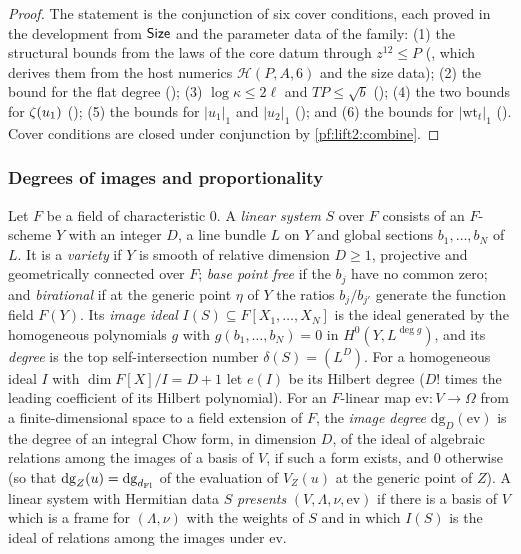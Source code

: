 \begin{proof}
The statement is the conjunction of six cover conditions, each proved in the development from $\mathsf{Size}$ and
the parameter data of the family: (1) the structural bounds from the laws of the core datum through $z^{12}\le P$
(, which derives them from the host numerics $\mathcal H(P,A,6)$
and the size data); (2) the bound for the flat degree
(); (3) $\log\kappa\le2\ell$ and $TP\le\sqrt b$
(); (4) the two bounds for $\zeta(u_1)$
(); (5) the bounds for $|u_1|_1$ and $|u_2|_1$
(); and (6) the bounds for $|\mathrm{wt}_t|_1$
(). Cover conditions are closed under conjunction by
\cref{pf:lift2:combine}.
\end{proof}

\subsubsection*{Degrees of images and proportionality}

\begin{definition}\label{pf:lift2:def:linsys}
Let $F$ be a field of characteristic $0$. A \emph{linear system} $S$ over $F$ consists of an $F$-scheme $Y$ with an
integer $D$, a line bundle $L$ on $Y$ and global sections $b_1,\dots,b_N$ of $L$. It is a \emph{variety} if $Y$ is
smooth of relative dimension $D\ge1$, projective and geometrically connected over $F$; \emph{base point free} if the
$b_j$ have no common zero; and \emph{birational} if at the generic point $\eta$ of $Y$ the ratios $b_j/b_{j'}$
generate the function field $F(Y)$. Its \emph{image ideal} $I(S)\subseteq F[X_1,\dots,X_N]$ is the ideal generated by
the homogeneous polynomials $g$ with $g(b_1,\dots,b_N)=0$ in $H^0(Y,L^{\deg g})$, and its \emph{degree} is the top
self-intersection number $\delta(S)=(L^D)$. For a homogeneous ideal $I$ with $\dim F[X]/I=D+1$ let $e(I)$ be its
Hilbert degree ($D!$ times the leading coefficient of its Hilbert polynomial). For an $F$-linear map
$\mathrm{ev}\colon V\to\Omega$ from a finite-dimensional space to a field extension of $F$, the \emph{image degree}
$\mathrm{dg}_D(\mathrm{ev})$ is the degree of an integral Chow form, in dimension $D$, of the ideal of algebraic
relations among the images of a basis of $V$, if such a form exists, and $0$ otherwise (so that
$\mathrm{dg}_Z(u)=\mathrm{dg}_{d_{\mathrm{Fl}}}$ of the evaluation of $V_Z(u)$ at the generic point of $Z$). A linear
system with Hermitian data $S$ \emph{presents} $(V,\Lambda,\nu,\mathrm{ev})$ if there is a basis of $V$ which is a frame
for $(\Lambda,\nu)$ with the weights of $S$ and in which $I(S)$ is the ideal of relations among the images under
$\mathrm{ev}$.
\end{definition}

